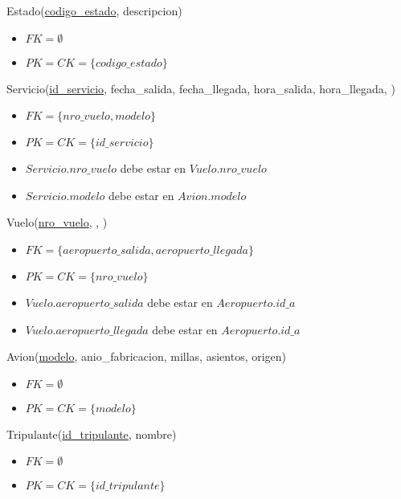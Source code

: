 \vspace*{0.5cm}
\noindent
Estado(\underline{codigo\_estado}, descripcion)
\begin{itemize}
	\item $FK = \emptyset$
	\item $PK = CK = \{codigo\_estado\}$
\end{itemize}

\vspace*{0.5cm}
\noindent
Servicio(\underline{id\_servicio}, fecha\_salida, fecha\_llegada,
	hora\_salida, hora\_llegada, )
\begin{itemize}
	\item $FK = \{nro\_vuelo, modelo\}$
	\item $PK = CK = \{id\_servicio\}$
	\item $Servicio.nro\_vuelo$ debe estar en $Vuelo.nro\_vuelo$
	\item $Servicio.modelo$ debe estar en $Avion.modelo$
\end{itemize}

\vspace*{0.5cm}
\noindent
Vuelo(\underline{nro\_vuelo}, ,
	)
\begin{itemize}
	\item $FK = \{aeropuerto\_salida, aeropuerto\_llegada\}$
	\item $PK = CK = \{nro\_vuelo\}$
	\item $Vuelo.aeropuerto\_salida$ debe estar en $Aeropuerto.id\_a$
	\item $Vuelo.aeropuerto\_llegada$ debe estar en $Aeropuerto.id\_a$
\end{itemize}

\vspace*{0.5cm}
\noindent
Avion(\underline{modelo}, anio\_fabricacion, millas, asientos, origen)
\begin{itemize}
	\item $FK = \emptyset$
	\item $PK = CK = \{modelo\}$
\end{itemize}


\vspace*{0.5cm}
\noindent
Tripulante(\underline{id\_tripulante}, nombre)
\begin{itemize}
	\item $FK = \emptyset$
	\item $PK = CK = \{id\_tripulante\}$
\end{itemize}


